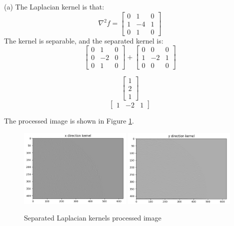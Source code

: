 \problem{}
(a) The Laplacian kernel is that:
$$
\nabla^2 f = \begin{bmatrix}
    0 & 1 & 0 \\
    1 & -4 & 1 \\
    0 & 1 & 0
\end{bmatrix}
$$
The kernel is separable, and the separated kernel is:
$$
\begin{bmatrix}
    0 & 1 & 0 \\
    0 & -2 & 0 \\
    0 & 1 & 0
\end{bmatrix}
+
\begin{bmatrix}
    0 & 0 & 0 \\
    1 & -2 & 1 \\
    0 & 0 & 0
\end{bmatrix}
$$

$$\begin{bmatrix}1\\2\\1\end{bmatrix}$$
$$\begin{bmatrix}1 & -2 & 1\end{bmatrix}$$

The processed image is shown in Figure \ref{fig:p2a}.

\begin{figure}[htbp]
    \centering
	\includegraphics[width=0.48\textwidth]{../images/p2/p2a_x_direction.png}
	\includegraphics[width=0.48\textwidth]{../images/p2/p2a_y_direction.png}
    \caption{Separated Laplacian kernels processed image}
\label{fig:p2a}
\end{figure}


